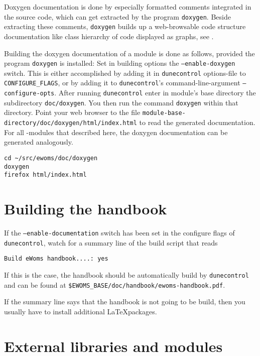 Doxygen documentation is done by especially formatted comments
integrated in the source code, which can get extracted by the program
\texttt{doxygen}. Beside extracting these comments, \texttt{doxygen}
builds up a web-browsable code structure documentation like class
hierarchy of code displayed as graphs, see \cite{DOXYGEN-HP}.

Building the doxygen documentation of a module is done as follows,
provided the program \texttt{doxygen} is installed: Set in building
options the \texttt{--enable-doxygen} switch.  This is either
accomplished by adding it in \texttt{dunecontrol} options-file to
\texttt{CONFIGURE\_FLAGS}, or by adding it to \texttt{dunecontrol}'s
command-line-argument \texttt{--configure-opts}.  After running
\texttt{dunecontrol} enter in module's base directory the subdirectory
\texttt{doc/doxygen}.  You then run the command \texttt{doxygen}
within that directory. Point your web browser to the file
\texttt{module-base-directory/doc/doxygen/html/index.html} to read the
generated documentation.  For all \Dune-modules that described here,
the doxygen documentation can be generated analogously.

\begin{lstlisting}[style=Bash]
cd ~/src/ewoms/doc/doxygen
doxygen
firefox html/index.html
\end{lstlisting}

\section{Building the \eWoms handbook}

If the \texttt{--enable-documentation} switch has been set in the configure flags of
\texttt{dunecontrol}, watch for a summary line of the build script that reads
\begin{lstlisting}[style=Bash]
Build eWoms handbook....: yes
\end{lstlisting}

If this is the case, the handbook should be automatically build by
\texttt{dunecontrol} and can be found at
\texttt{\$EWOMS\_BASE/doc/handbook/ewoms-handbook.pdf}.

If the summary line says that the handbook is not going to be build,
then you usually have to install additional \LaTeX packages.

\section{External libraries and modules}
\label{sec:external-modules-libraries}


